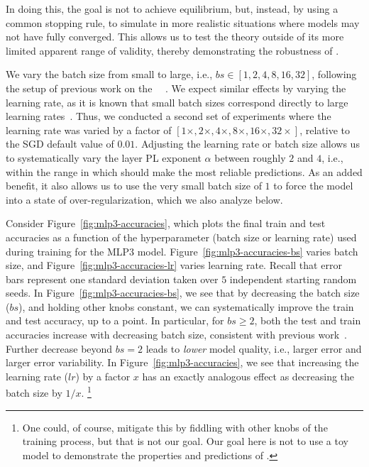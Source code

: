 In doing this, the goal is not to achieve \Thermodynamic equilibrium,
but, instead, by using a common stopping rule, to simulate 
in more realistic situations where models may not have fully converged.   This  allows us to test the theory outside of
its more limited apparent range of validity, 
thereby demonstrating the robustness of \SETOL.

We vary the batch size from small to large, i.e., $bs\in[1,2,4,8,16,32]$, following the setup of previous work on the \HTSR~\Phenomenology~\cite{MM18_TR_JMLRversion}. 
We expect similar effects by varying the learning rate, as it is known that small batch sizes correspond directly to large learning rates~\cite{SKYL17_TR,WT11}. 
Thus, we conducted a second set of experiments where the learning rate was varied by a factor of 
$[1\times,2\times,4\times,8\times,16\times,32\times]$, relative to the SGD default value of $0.01$. 
Adjusting the learning rate or batch size allows us to systematically vary the layer PL exponent $\alpha$ between roughly $2$ and $4$, i.e., within the range in which \SETOL should make the most reliable predictions. 
As an added benefit, it also allows us to use the very small batch size of $1$ to force the model into a state of over-regularization, which we also analyze below.



Consider Figure~\ref{fig:mlp3-accuracies}, which plots the final train and test accuracies as a function of the hyperparameter (batch size or learning rate) used during training for the MLP3 model.
Figure~\ref{fig:mlp3-accuracies-bs} varies batch size, and Figure~\ref{fig:mlp3-accuracies-lr} varies learning rate.
Recall that error bars represent one standard deviation taken over $5$ independent starting random seeds. 
In Figure~\ref{fig:mlp3-accuracies-bs}, we see that by decreasing the batch size ($bs$), and holding other knobs constant, we can systematically improve the train and test accuracy, up to a point. 
In particular, for $bs \ge 2$, both the test and train accuracies increase with decreasing batch size, consistent with previous work~\cite{MM18_TR_JMLRversion}.
Further decrease beyond $bs=2$ leads to \emph{lower} model quality, i.e., larger error and larger error variability.
In Figure~\ref{fig:mlp3-accuracies}, we see that increasing the learning rate ($lr$) by a factor $x$ has an exactly analogous effect as decreasing the batch size by $1/x$.%
\footnote{One could, of course, mitigate this by fiddling with other knobs of the training process, but that is not our goal.  Our goal here is not to use a toy model to demonstrate the properties and predictions of \SETOL.}

